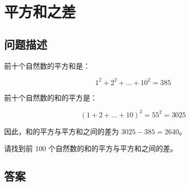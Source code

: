 \section{平方和之差}
\subsection{问题描述}
\begin{tcolorbox}
	前十个自然数的平方和是：

	\[
		1^2 + 2^2 + \dots + 10^2 = 385
	\]

	前十个自然数的和的平方是：

	\[
		(1 + 2 + \dots + 10)^2 = 55^2 = 3025
	\]

	因此，和的平方与平方和之间的差为 \( 3025 - 385 = 2640 \)。

	请找到前 100 个自然数的和的平方与平方和之间的差。
\end{tcolorbox}

\subsection{答案}
